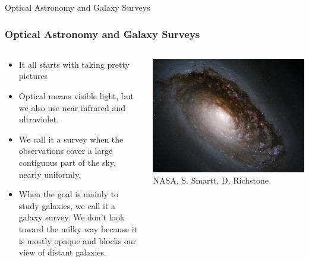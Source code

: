 \documentclass{beamer}
\begin{document}
\frame
{

    {\huge Optical Astronomy and Galaxy Surveys}

}
\frame
{

    \frametitle{Optical Astronomy and Galaxy Surveys}


    \begin{columns}
        \begin{column}{0.5\textwidth}
            \begin{itemize}

                \item It all starts with taking pretty pictures

                \item Optical means visible light, but we also use near infrared
                    and ultraviolet.

                \item We call it a survey when the observations cover a large
                    contiguous part of the sky, nearly uniformly.

                \item When the goal is mainly to study galaxies, we call it a
                    galaxy survey. We don't look toward the milky way because it
                    is mostly opaque and blocks our view of distant galaxies.

            \end{itemize}
        \end{column}
        \begin{column}{0.5\textwidth}
            \begin{center}
                \includegraphics[width=\textwidth]{m64-black-eye-galaxy.jpg}
                \newline
                {\tiny NASA, S. Smartt, D. Richstone}
            \end{center}

            
        \end{column}
    \end{columns}


}
\end{document}
